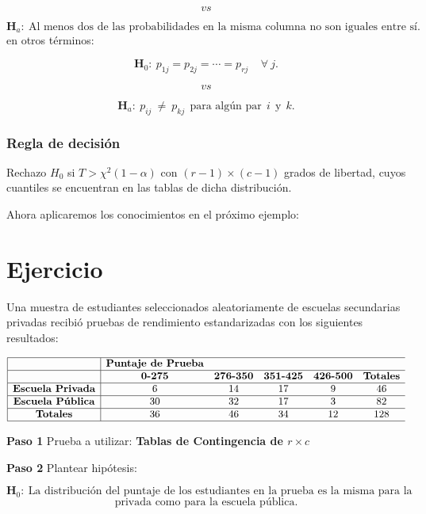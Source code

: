 \documentclass[
  a4paper,
  oneside,
  openany]{book}
\begin{document}
\[vs\]

\[\textbf{H}_a: \ \mbox{Al menos dos de las probabilidades en la misma columna no son iguales entre sí.}\]
en otros términos:

\[\textbf{H}_0: \ p_{1j}=p_{2j}= \cdots=p_{rj} \ \ \ \ \  \forall\  j.\]

\[vs\]

\[\textbf{H}_a: \ p_{ij} \ \neq \  p_{kj} \ \ \mbox{para algún par} \ \  i \ \ \mbox{y} \ \ k.\]

\hypertarget{regla-de-decisiuxf3n-25}{%
\subsubsection*{Regla de decisión}\label{regla-de-decisiuxf3n-25}}


Rechazo \(H_0\) si \(T> \chi^2(1-\alpha)\) con \((r-1)\times(c-1)\) grados de libertad, cuyos cuantiles se encuentran en las tablas de dicha distribución.

Ahora aplicaremos los conocimientos en el próximo ejemplo:

\hypertarget{ejercicio-1}{%
\section{Ejercicio}\label{ejercicio-1}}

Una muestra de estudiantes seleccionados aleatoriamente de escuelas secundarias privadas recibió pruebas de rendimiento estandarizadas con los siguientes resultados:

\[
\begin{array}{ |c|cc c c c c|}
\hline
&\textbf{Puntaje de Prueba}&&&&\\
\hline
&\textbf{0-275} & \textbf{276-350} & \textbf{351-425} & \textbf{426-500} & \textbf{Totales} \\
\hline
\textbf{Escuela Privada} & 6    & 14 & 17 & 9 & 46 \\
\hline
\textbf{Escuela Pública} & 30   & 32 & 17 & 3 & 82 \\
\hline
\textbf{Totales} & 36   & 46 & 34 & 12 & 128 \\
\hline
\end{array}
\]

\textbf{Paso 1} Prueba a utilizar: \textbf{Tablas de Contingencia de \(r\times c\)}

\textbf{Paso 2} Plantear hipótesis:

\[\textbf{H}_0: \ \mbox{La distribución del puntaje de los estudiantes en la prueba es la misma para la escuela}\]
\[\mbox{privada como para la escuela pública.}\]
\end{document}
